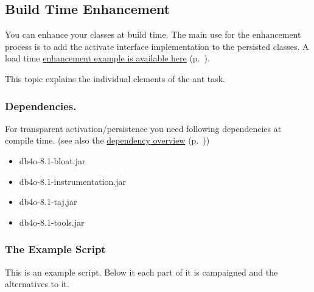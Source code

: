 \subsection{Build Time Enhancement}
\label{ref:advanced-topics-enhancement-tools-enhancement-for-java-build-time-enhancement}

You can enhance your classes at build time. The main use for the enhancement process is to add the activate interface implementation to the persisted classes. A load time \hyperref[ref:basics-transparentpersistence-ta-enhanced-example]{enhancement example is available here} (p.~\pageref{ref:basics-transparentpersistence-ta-enhanced-example}).

This topic explains the individual elements of the ant task.

\subsubsection*{Dependencies.}

For transparent activation/persistence you need following dependencies at compile time. (see also the \hyperref[ref:dependency-overview]{dependency overview} (p.~\pageref{ref:dependency-overview}))

\begin{itemize}
\item db4o-8.1-bloat.jar
\item db4o-8.1-instrumentation.jar
\item db4o-8.1-taj.jar
\item db4o-8.1-tools.jar
\end{itemize}

\subsubsection*{The Example Script}

This is an example script. Below it each part of it is campaigned and the alternatives to it.

